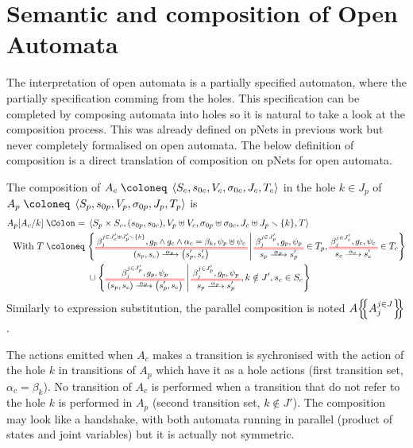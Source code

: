 \documentclass{article}
\begin{document}
\section{Semantic and composition of Open Automata}
The interpretation of open automata is a partially specified automaton, where the partially specification comming from the holes.
This specification can be completed by composing automata into holes so it is natural to take a look at the composition process.
This was already defined on pNets in previous work but never completely formalised on open automata.
The below definition of composition is a direct translation of composition on pNets for open automata.
\begin{defi}
The composition of \(A_c \defobject \OA{S_c}{s_{0c}}{V_c}{\sigma_{0c}}{J_c}{T_c}\) in the hole \(k \in J_p\) of \(A_p \defobject \OA{S_p}{s_{0p}}{V_p}{\sigma_{0p}}{J_p}{T_p}\) is
\begin{align*}
	A_p\subst{A_c}{k} \defnotation & \OA{S_p \times S_c}{\mpar{s_{0p}, s_{0c}}}{V_p \uplus V_c}{\sigma_{0p} \uplus \sigma_{0c}}{J_c \uplus J_p \setminus \mbrc{k}}{T} \\
	\text{With } T \defobject & \mset{\OT{\mpar{s_p, s_c}}{\mpar{s'_p, s'_c}}{\alpha_p}{\beta_j^{j \in J'_c \uplus J'_p \setminus \mbrc{k}}}{g_p \wedge g_c \wedge \alpha_c = \beta_k}{\psi_p \uplus \psi_c}}{\OTx{p}{}{}{p} \in T_p, \OTx{c}{}{}{c} \in T_c} \\
	& \cup \mset{\OT{\mpar{s_p, s_c}}{\mpar{s'_p, s_c}}{\alpha_p}{\beta_j^{j \in J'_p}}{g_p}{\psi_p}}{\OTx{p}{}{}{p}, k \notin J', s_c \in S_c}
\end{align*}
Similarly to expression substitution, the parallel composition is noted \(A{\left\{\!\!{\left\{A_j^{j \in J}\right\}}\!\!\right\}}\).
\end{defi}
The actions emitted when \(A_c\) makes a transition is sychronised with the action of the hole \(k\) in transitions of \(A_p\) which have it as a hole actions (first transition set, \(\alpha_c = \beta_k\)).
No transition of \(A_c\) is performed when a transition that do not refer to the hole \(k\) is performed in \(A_p\) (second transition set, \(k \notin J'\)).
The composition may look like a handshake, with both automata running in parallel (product of states and joint variables) but it is actually not symmetric.
\end{document}
